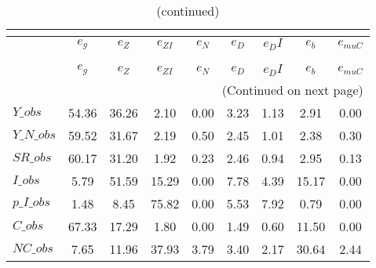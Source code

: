  
\begin{center}
\begin{longtable}{lcccccccc} 
\caption{VARIANCE DECOMPOSITION (in percent)}\\
 \label{Table:th_var_decomp_uncond}\\
\toprule 
$               $	 & 	 $        {e_g}$	 & 	 $        {e_Z}$	 & 	 $     {e_{ZI}}$	 & 	 $        {e_N}$	 & 	 $        {e_D}$	 & 	 $       {e_DI}$	 & 	 $        {e_b}$	 & 	 $    {e_{muC}}$\\
\midrule \endfirsthead 
\caption{(continued)}\\
 \toprule \\ 
$               $	 & 	 $        {e_g}$	 & 	 $        {e_Z}$	 & 	 $     {e_{ZI}}$	 & 	 $        {e_N}$	 & 	 $        {e_D}$	 & 	 $       {e_DI}$	 & 	 $        {e_b}$	 & 	 $    {e_{muC}}$\\
\midrule \endhead 
\midrule \multicolumn{9}{r}{(Continued on next page)} \\ \bottomrule \endfoot 
\bottomrule \endlastfoot 
$Y\_obs         $	 & 	        54.36	 & 	        36.26	 & 	         2.10	 & 	         0.00	 & 	         3.23	 & 	         1.13	 & 	         2.91	 & 	         0.00 \\ 
$Y\_N\_obs      $	 & 	        59.52	 & 	        31.67	 & 	         2.19	 & 	         0.50	 & 	         2.45	 & 	         1.01	 & 	         2.38	 & 	         0.30 \\ 
$SR\_obs        $	 & 	        60.17	 & 	        31.20	 & 	         1.92	 & 	         0.23	 & 	         2.46	 & 	         0.94	 & 	         2.95	 & 	         0.13 \\ 
$I\_obs         $	 & 	         5.79	 & 	        51.59	 & 	        15.29	 & 	         0.00	 & 	         7.78	 & 	         4.39	 & 	        15.17	 & 	         0.00 \\ 
$p\_I\_obs      $	 & 	         1.48	 & 	         8.45	 & 	        75.82	 & 	         0.00	 & 	         5.53	 & 	         7.92	 & 	         0.79	 & 	         0.00 \\ 
$C\_obs         $	 & 	        67.33	 & 	        17.29	 & 	         1.80	 & 	         0.00	 & 	         1.49	 & 	         0.60	 & 	        11.50	 & 	         0.00 \\ 
$NC\_obs        $	 & 	         7.65	 & 	        11.96	 & 	        37.93	 & 	         3.79	 & 	         3.40	 & 	         2.17	 & 	        30.64	 & 	         2.44 \\ 

\end{longtable}
\end{center}
